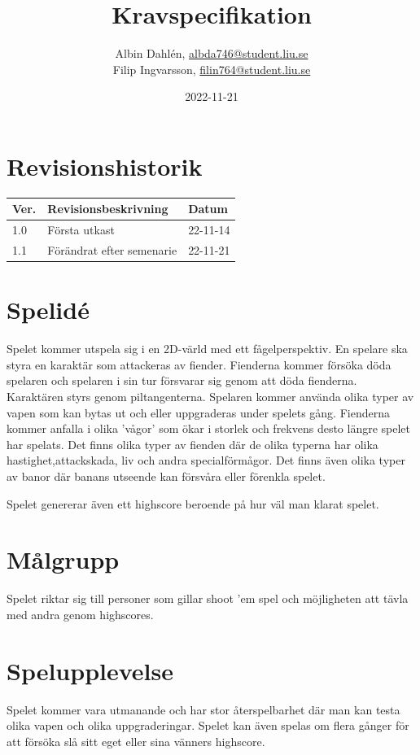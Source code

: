 \documentclass{TDP005mall}
\author{Albin Dahlén, \url{albda746@student.liu.se}\\
  Filip Ingvarsson, \url{filin764@student.liu.se}}
\title{Kravspecifikation}
\date{2022-11-21}
\begin{document}
\projectpage
\section{Revisionshistorik}
\begin{table}[!h]
\begin{tabularx}{\linewidth}{|l|X|l|}
\hline
Ver. & Revisionsbeskrivning & Datum \\\hline
1.0 & Första utkast & 22-11-14 \\\hline
1.1 & Förändrat efter semenarie & 22-11-21 \\\hline
\end{tabularx}
\end{table}


\section{Spelidé}
Spelet kommer utspela sig i en 2D-värld med ett fågelperspektiv. En spelare ska styra en karaktär som attackeras av fiender.
Fienderna kommer försöka döda spelaren och spelaren i sin tur försvarar sig genom att döda fienderna. Karaktären styrs genom piltangenterna.
Spelaren kommer använda olika typer av vapen som kan bytas ut och eller uppgraderas under spelets gång. Fienderna kommer anfalla i olika 'vågor' som ökar i storlek och frekvens desto längre spelet har spelats.
Det finns olika typer av fienden där de olika typerna har olika hastighet,attackskada, liv och andra specialförmågor. Det finns även olika typer av banor där banans utseende kan försvåra eller förenkla spelet.

Spelet genererar även ett highscore beroende på hur väl man klarat spelet.


\section{Målgrupp}
Spelet riktar sig till personer som gillar shoot 'em spel och möjligheten att tävla med andra genom highscores.

\section{Spelupplevelse}
Spelet kommer vara utmanande och har stor återspelbarhet där man kan testa olika vapen och olika uppgraderingar.
Spelet kan även spelas om flera gånger för att försöka slå sitt eget eller sina vänners highscore.
\end{document}
